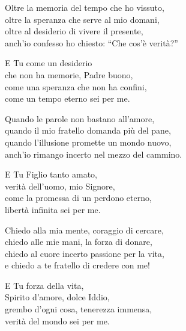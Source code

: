 
\strofa Oltre la memoria del tempo che ho vissuto,\\
oltre la speranza che serve al mio domani,\\
oltre al desiderio di vivere il presente,\\
anch'io confesso ho chiesto: ``Che cos'è verità?''

\spazio

E Tu come un desiderio\\
che non ha memorie, Padre buono,\\
come una speranza che non ha confini,\\
come un tempo eterno sei per me.

\spazio


\spazio

\strofa Quando le parole non bastano all'amore,\\
quando il mio fratello domanda più del pane,\\
quando l'illusione promette un mondo nuovo,\\
anch'io rimango incerto nel mezzo del cammino.

\spazio

E Tu Figlio tanto amato,\\
verità dell'uomo, mio Signore,\\
come la promessa di un perdono eterno,\\
libertà infinita sei per me.

\spazio


\spazio

\strofa Chiedo alla mia mente, coraggio di cercare,\\
chiedo alle mie mani, la forza di donare,\\
chiedo al cuore incerto passione per la vita,\\
e chiedo a te fratello di credere con me!

\spazio

E Tu forza della vita,\\
Spirito d'amore, dolce Iddio,\\
grembo d'ogni cosa, tenerezza immensa,\\
verità del mondo sei per me.

\spazio


